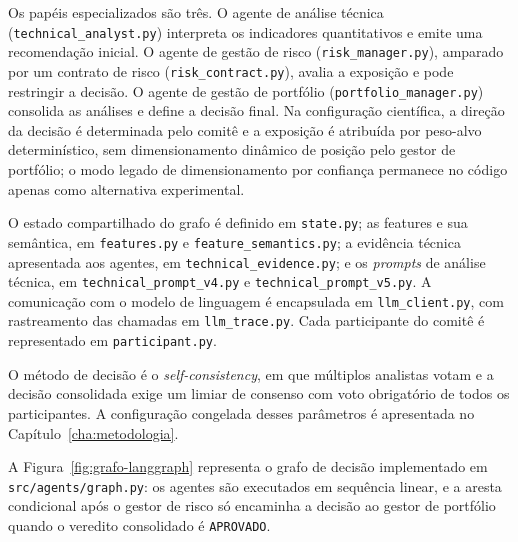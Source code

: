 Os papéis especializados são três. O agente de análise técnica (\texttt{technical\_analyst.py}) interpreta os indicadores quantitativos e emite uma recomendação inicial. O agente de gestão de risco (\texttt{risk\_manager.py}), amparado por um contrato de risco (\texttt{risk\_contract.py}), avalia a exposição e pode restringir a decisão. O agente de gestão de portfólio (\texttt{portfolio\_manager.py}) consolida as análises e define a decisão final. Na configuração científica, a direção da decisão é determinada pelo comitê e a exposição é atribuída por peso-alvo determinístico, sem dimensionamento dinâmico de posição pelo gestor de portfólio; o modo legado de dimensionamento por confiança permanece no código apenas como alternativa experimental.

O estado compartilhado do grafo é definido em \texttt{state.py}; as features e sua semântica, em \texttt{features.py} e \texttt{feature\_semantics.py}; a evidência técnica apresentada aos agentes, em \texttt{technical\_evidence.py}; e os \textit{prompts} de análise técnica, em \texttt{technical\_prompt\_v4.py} e \texttt{technical\_prompt\_v5.py}. A comunicação com o modelo de linguagem é encapsulada em \texttt{llm\_client.py}, com rastreamento das chamadas em \texttt{llm\_trace.py}. Cada participante do comitê é representado em \texttt{participant.py}.

O método de decisão é o \textit{self-consistency}, em que múltiplos analistas votam e a decisão consolidada exige um limiar de consenso com voto obrigatório de todos os participantes. A configuração congelada desses parâmetros é apresentada no Capítulo~\ref{cha:metodologia}.

A Figura~\ref{fig:grafo-langgraph} representa o grafo de decisão implementado em \texttt{src/agents/graph.py}: os agentes são executados em sequência linear, e a aresta condicional após o gestor de risco só encaminha a decisão ao gestor de portfólio quando o veredito consolidado é \texttt{APROVADO}.

